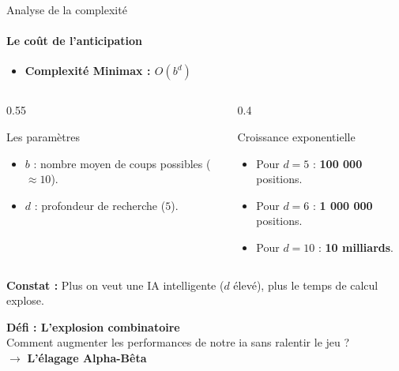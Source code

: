 \documentclass[10pt, aspectratio=169]{beamer}
\begin{document}
\begin{frame}{Analyse de la complexité}
    \framesubtitle{Le coût de l'anticipation}

    \begin{itemize}
        \item \textbf{Complexité Minimax : $O(b^d)$}
    \end{itemize}

    \vspace{0.4cm}

    \begin{columns}[T]
        \begin{column}{0.55\textwidth}
            \begin{block}{Les paramètres}
                \begin{itemize}
                    \item \textbf{$b$} : nombre moyen de coups possibles ($\approx 10$).
                    \item \textbf{$d$} : profondeur de recherche ($5$).
                \end{itemize}
            \end{block}
        \end{column}

        \begin{column}{0.4\textwidth}
            \begin{block}{Croissance exponentielle}
                \begin{itemize}
                    \item Pour $d=5$ : \textbf{100 000} positions.
                    \item Pour $d=6$ : \textbf{1 000 000} positions.
                    \item Pour $d=10$ : \textbf{10 milliards}.
                \end{itemize}
            \end{block}
        \end{column}
    \end{columns}

    \vspace{1cm}
    \centering
    \textcolor{DarkPink}{\textbf{Constat :}} Plus on veut une IA intelligente ($d$ élevé), plus le temps de calcul explose.
\end{frame}

\begin{frame}
    \centering
    \Large \textcolor{DarkPink}{\textbf{Défi : L'explosion combinatoire}} \\
    \vspace{0.5cm}
    \normalsize Comment augmenter les performances de notre ia sans ralentir le jeu ? \\
    \vspace{0.8cm}
    $\rightarrow$ \textbf{L'élagage Alpha-Bêta}
\end{frame}
\end{document}
